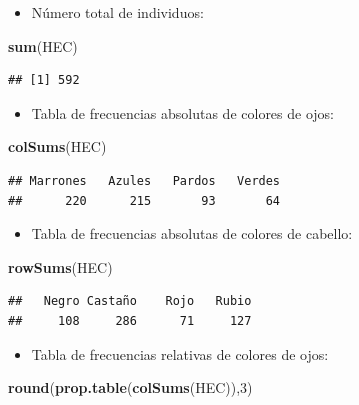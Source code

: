\documentclass[]{book}
\newenvironment{Shaded}{\begin{snugshade}}{\end{snugshade}}
\newcommand{\DecValTok}[1]{\textcolor[rgb]{0.00,0.00,0.81}{#1}}
\newcommand{\KeywordTok}[1]{\textcolor[rgb]{0.13,0.29,0.53}{\textbf{#1}}}
\newcommand{\NormalTok}[1]{#1}
\providecommand{\tightlist}{%
  \setlength{\itemsep}{0pt}\setlength{\parskip}{0pt}}
\theoremstyle{definition}
\theoremstyle{definition}
\theoremstyle{definition}
\theoremstyle{remark}
\begin{document}
\begin{itemize}
\tightlist
\item
  Número total de individuos:
\end{itemize}

\begin{Shaded}
\begin{Highlighting}[]
\KeywordTok{sum}\NormalTok{(HEC)}
\end{Highlighting}
\end{Shaded}

\begin{verbatim}
## [1] 592
\end{verbatim}

\begin{itemize}
\tightlist
\item
  Tabla de frecuencias absolutas de colores de ojos:
\end{itemize}

\begin{Shaded}
\begin{Highlighting}[]
\KeywordTok{colSums}\NormalTok{(HEC)}
\end{Highlighting}
\end{Shaded}

\begin{verbatim}
## Marrones   Azules   Pardos   Verdes 
##      220      215       93       64
\end{verbatim}

\begin{itemize}
\tightlist
\item
  Tabla de frecuencias absolutas de colores de cabello:
\end{itemize}

\begin{Shaded}
\begin{Highlighting}[]
\KeywordTok{rowSums}\NormalTok{(HEC)       }
\end{Highlighting}
\end{Shaded}

\begin{verbatim}
##   Negro Castaño    Rojo   Rubio 
##     108     286      71     127
\end{verbatim}

\begin{itemize}
\tightlist
\item
  Tabla de frecuencias relativas de colores de ojos:
\end{itemize}

\begin{Shaded}
\begin{Highlighting}[]
\KeywordTok{round}\NormalTok{(}\KeywordTok{prop.table}\NormalTok{(}\KeywordTok{colSums}\NormalTok{(HEC)),}\DecValTok{3}\NormalTok{)}
\end{Highlighting}
\end{Shaded}
\end{document}
